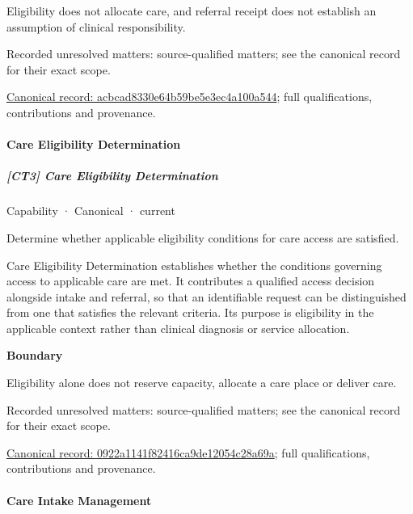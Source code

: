 Eligibility does not allocate care, and referral receipt does not establish an assumption of clinical responsibility.


{\small Recorded unresolved matters: source-qualified matters; see the canonical record for their exact scope.}\par
{\footnotesize \href{../../../../continuum/strategy/capability/acbcad8330e64b59be5e3ec4a100a544.md}{Canonical record: acbcad8330e64b59be5e3ec4a100a544}; full qualifications, contributions and provenance.}\par
\paragraph{Care Eligibility Determination}

\subparagraph{[CT3] Care Eligibility Determination}

\label{element:0922a1141f82416ca9de12054c28a69a}
{\small Capability · Canonical · current}\par

Determine whether applicable eligibility conditions for care access are satisfied.



Care Eligibility Determination establishes whether the conditions governing access to applicable care are met. It contributes a qualified access decision alongside intake and referral, so that an identifiable request can be distinguished from one that satisfies the relevant criteria. Its purpose is eligibility in the applicable context rather than clinical diagnosis or service allocation.



\textbf{Boundary}



Eligibility alone does not reserve capacity, allocate a care place or deliver care.


{\small Recorded unresolved matters: source-qualified matters; see the canonical record for their exact scope.}\par
{\footnotesize \href{../../../../continuum/strategy/capability/0922a1141f82416ca9de12054c28a69a.md}{Canonical record: 0922a1141f82416ca9de12054c28a69a}; full qualifications, contributions and provenance.}\par
\paragraph{Care Intake Management}

